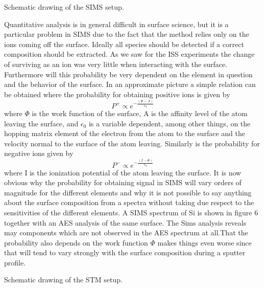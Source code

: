 \vspace*{11cm}

 Schematic drawing of the SIMS setup.

\vspace{1cm}

Quantitative analysis is in general difficult in surface science, but it is a particular problem in SIMS due to the fact that the method relies only on the ions coming off the surface. Ideally all species should be detected if a correct composition should be extracted. As we saw for the ISS experiments the change of surviving as an ion was very little when interacting with the surface. Furthermore will this probability be very dependent on the element in question and the behavior of the surface. In an approximate picture a simple relation can be obtained \cite{Norskovlang} where the probability for obtaining positive ions is given by
\begin{equation}
P^{+} \propto e^{-\frac{(\Phi-A)}{\epsilon_{0}}} 
\end{equation}
where $\Phi$ is the work function of the surface, A is the affinity level of the atom leaving the surface, and $\epsilon_0$ is a variable dependent, among other things, on the hopping matrix element of the electron from the atom to the surface and the velocity normal to the surface of the atom leaving. Similarly is the probability for negative ions given by
\begin{equation}
P^{-} \propto e^{-\frac{(I-\Phi)}{\epsilon_{0}}} 
\end{equation}
where I is the ionization potential of the atom leaving the surface. It is now obvious why the probability for obtaining signal in SIMS will vary orders of magnitude for the different elements and why it is not possible to say anything about the surface composition from a spectra without taking due respect to the sensitivities of the different elements.  A SIMS spectrum of Si is shown in figure 6 together with an AES analysis of the same surface. The Sims analysis reveals may components which are not observed in the AES spectrum at all.That the probability also depends on the work function $\Phi$ makes things even worse since that will tend to vary strongly with the surface composition during a sputter profile. 


\vspace*{16cm}

 Schematic drawing of the STM setup.

\vspace{1cm}

